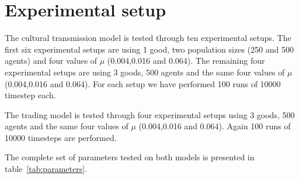 \documentclass{wscpaperproc}
\begin{document}
\section{Experimental setup}
%

The cultural transmission model is tested through ten experimental setups. The first six experimental setups are using 1 good, two population sizes (250 and 500 agents) and four values of $\mu$ (0.004,0.016 and 0.064). The remaining four experimental setups are using 3 goods, 500 agents and the same four values of $\mu$ (0.004,0.016 and 0.064). For each setup we have performed 100 runs of 10000 timestep each. 

The trading model is tested through four experimental setups using 3 goods, 500 agents and the same four values of $\mu$ (0.004,0.016 and 0.064). Again 100 runs of 10000 timesteps are performed.

The complete set of parameters tested on both models is presented in table~\ref{tab:parameters}. 
\end{document}
